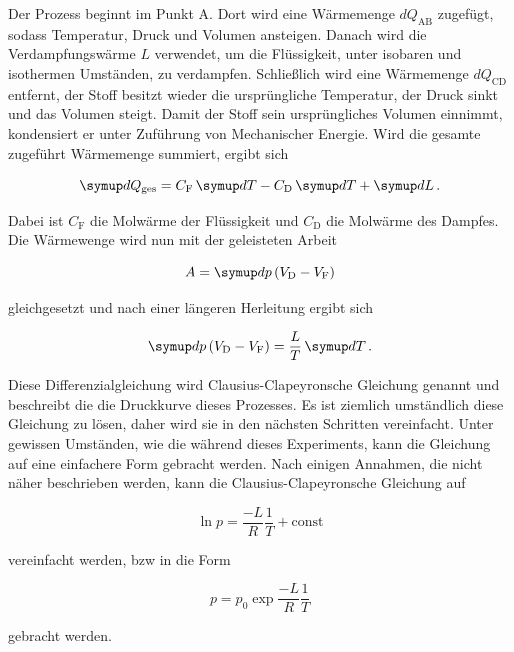 Der Prozess beginnt im Punkt A.
Dort wird eine Wärmemenge $dQ_\text{AB}$ zugefügt, sodass Temperatur, Druck und Volumen ansteigen.
Danach wird die Verdampfungswärme $L$ verwendet, um die Flüssigkeit, unter isobaren und isothermen Umständen, zu verdampfen.
Schließlich wird eine Wärmemenge $dQ_\text{CD}$ entfernt, der Stoff besitzt wieder die ursprüngliche Temperatur, der Druck sinkt und das Volumen steigt.
Damit der Stoff sein ursprüngliches Volumen einnimmt, kondensiert er unter Zuführung von Mechanischer Energie.
Wird die gesamte zugeführt Wärmemenge summiert, ergibt sich

\begin{equation}
    \dif{Q_\text{ges}} = C_\text{F} \dif{T} - C_\text{D} \dif{T} + \dif{L}.
    \label{eq:waerme}
\end{equation}

Dabei ist $C_\text{F}$ die Molwärme der Flüssigkeit und $C_\text{D}$ die Molwärme des Dampfes.
Die Wärmewenge wird nun mit der geleisteten Arbeit

\begin{equation}
    A = \dif{p} \left(V_\text{D} - V_\text{F}\right)
    \label{eq:arbeit}
\end{equation}

gleichgesetzt und nach einer längeren Herleitung ergibt sich

\begin{equation}
    \dif{p} \left(V_\text{D} - V_\text{F}\right) = \frac{L}{T} \dif{T}.
    \label{eq:clausius}
\end{equation}

Diese Differenzialgleichung wird Clausius-Clapeyronsche Gleichung genannt und beschreibt die die Druckkurve dieses Prozesses.
Es ist ziemlich umständlich diese Gleichung zu lösen, daher wird sie in den nächsten Schritten vereinfacht.
Unter gewissen Umständen, wie die während dieses Experiments, kann die Gleichung auf eine einfachere Form gebracht werden.
Nach einigen Annahmen, die nicht näher beschrieben werden, kann die Clausius-Clapeyronsche Gleichung auf

\begin{equation}
    \ln p = \frac{-L}{R} \frac{1}{T} + \text{const}
    \label{eq:clausius2}
\end{equation}

vereinfacht werden, bzw in die Form

\begin{equation}
    p =  p_0 \exp{\frac{-L}{R} \frac{1}{T}}
    \label{eq:clausius3}
\end{equation}

gebracht werden.